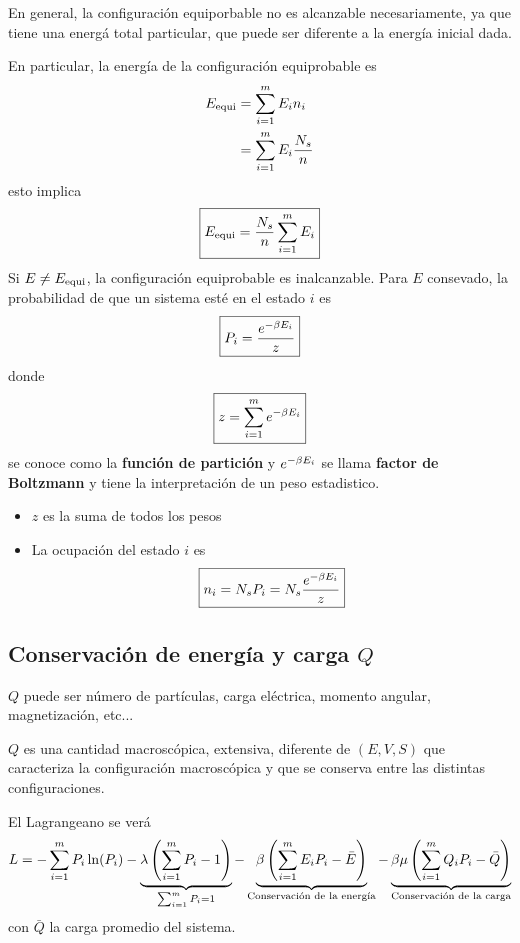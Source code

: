 En general, la configuración equiporbable no es alcanzable necesariamente, ya que tiene una energá total particular, que puede ser diferente a la energía inicial dada.

En particular, la energía de la configuración equiprobable es
\begin{align}
  E_{\rm equi}&=\sum_{i=1}^m E_in_i\\
  &=\sum_{i=1}^m E_i\frac{N_s}{n}
\end{align}
esto implica
\begin{equation}
  \boxed{E_{\rm equi}=\frac{N_s}{n}\sum_{i=1}^m E_i}
\end{equation}
Si $E\neq E_{\rm equi}$, la configuración equiprobable es inalcanzable. Para $E$ consevado, la probabilidad de que un sistema esté en el estado $i$ es
\begin{equation}
 \boxed{P_i=\frac{e^{-\beta E_i}}{z}}
\end{equation}
donde
\begin{equation}
\boxed{  z=\sum_{i=1}^m e^{-\beta E_i}}
\end{equation}
se conoce como la \textbf{función de partición} y $e^{-\beta E_i}$ se llama \textbf{factor de Boltzmann} y tiene la interpretación de un peso estadistico.
\begin{itemize}
	\item $z$ es la suma de todos los pesos
	\item La ocupación del estado $i$ es
	\begin{equation}
\boxed{  n_i=N_sP_i=N_s\frac{e^{-\beta E_i}}{z}}
\end{equation}
\end{itemize}

\subsection{Conservación de energía y carga $Q$}
$Q$ puede ser número de partículas, carga eléctrica, momento angular, magnetización, etc...

$Q$ es una cantidad macroscópica, extensiva, diferente de $(E,V,S)$ que caracteriza la configuración macroscópica y que se conserva entre las distintas configuraciones.

El Lagrangeano se verá
\begin{equation}
  L=-\sum_{i=1}^m P_i\ln(P_i)-\underbrace{\lambda \left(\sum_{i=1}^m P_i-1\right)}_{\sum_{i=1}^m P_i=1}-\underbrace{\beta\left(\sum_{i=1}^m E_iP_i-\bar{E}\right)}_{\text{Conservación de la energía}}-\underbrace{\beta \mu\left(\sum_{i=1}^m Q_iP_i-\bar{Q}\right)}_{\text{Conservación de la carga}}
\end{equation}
con $\bar{Q}$ la carga promedio del sistema.

